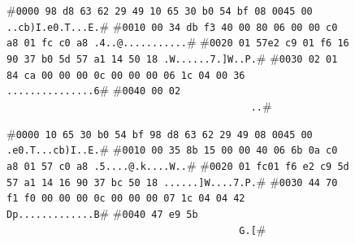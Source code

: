 \begin{figure}[tbp]

\begin{termc}[backgroundcolor=\color{backcolour}, escapechar=#]
#\texttt{\small{0000  \colorbox{purple!50}{98 d8 63 62 29 49 10 65 30 b0 54 bf 08 00}\colorbox{blue!30}{45 00}   ..cb)I.e0.T...E.}}#
#\texttt{\small{0010  \colorbox{blue!30}{00 34 db f3 40 00 80 06 00 00 c0 a8 01 fc c0 a8}   .4..@...........}}#
#\texttt{\small{0020  \colorbox{blue!30}{01 57}\colorbox{red!30}{e2 c9 01 f6 16 90 37 b0 5d 57 a1 14 50 18}   .W......7.]W..P.}}#
#\texttt{\small{0030  \colorbox{red!30}{02 01 84 ca 00 00} 00 0c 00 00 00 06 1c 04 00 36   ...............6}}#
#\texttt{\small{0040  00 02 \ \ \ \ \ \ \ \ \ \ \ \ \ \ \ \ \ \ \ \ \ \ \ \ \ \ \ \ \ \ \ \ \ \ \ \ \ \ \ \ \ \  ..}}#
                           
\end{termc}

\begin{termc}[backgroundcolor=\color{backcolour}, escapechar=#]
#\texttt{\small{0000  \colorbox{purple!50}{10 65 30 b0 54 bf 98 d8 63 62 29 49 08 00}\colorbox{blue!30}{45 00}   .e0.T...cb)I..E.}}#
#\texttt{\small{0010  \colorbox{blue!30}{00 35 8b 15 00 00 40 06 6b 0a c0 a8 01 57 c0 a8}   .5....@.k....W..}}#
#\texttt{\small{0020  \colorbox{blue!30}{01 fc}\colorbox{red!30}{01 f6 e2 c9 5d 57 a1 14 16 90 37 bc 50 18}   ......]W....7.P.}}#
#\texttt{\small{0030  \colorbox{red!30}{44 70 f1 f0 00 00} 00 0c 00 00 00 07 1c 04 04 42   Dp.............B}}#
#\texttt{\small{0040  47 e9 5b \ \ \ \ \ \ \ \ \ \ \ \ \ \ \ \ \ \ \ \ \ \ \ \ \ \ \ \ \ \ \ \ \ \ \ \ \ \ \ \  G.[}}#
                           
\end{termc}
\label{fig-exo-ws}
\end{figure}
